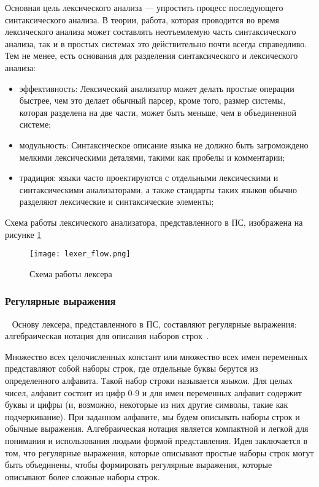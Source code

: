 Основная цель лексического анализа --- упростить процесс последующего синтаксического анализа. В теории, работа, которая проводится во время лексического анализа может
составлять неотъемлемую часть синтаксического анализа, так и в простых системах это действительно почти всегда справедливо. Тем не менее, есть основания для разделения синтаксического и лексического анализа:
\begin{itemize}
\item
  эффективность: Лексический анализатор может делать простые операции быстрее, чем это делает обычный парсер, кроме того, размер системы, которая разделена на две части, может
  быть меньше, чем в объединенной системе;
\item
  модульность: Синтаксическое описание языка не должно быть загромождено мелкими лексическими деталями, такими как пробелы и комментарии;
\item
  традиция: языки часто проектируются с отдельными лексическими и синтаксическими анализаторами, а также стандарты таких языков обычно разделяют лексические и синтаксические элементы;
\end{itemize}
Схема работы лексического анализатора, представленного в ПС, изображена на рисунке \ref{fig:arch_and_mod::lexer_flow}

\begin{figure}[!htb]
  \centering
  \texttt{[image: lexer\_flow.png]}
  \caption{ Схема работы лексера }
  \label{fig:arch_and_mod::lexer_flow}
  \clearpage
\end{figure}



\subsubsection{Регулярные выражения}~
\label{sec:arch_and_mod:regex}
Основу лексера, представленного в ПС, составляют регулярные выражения: алгебраическая нотация для описания наборов строк~\cite{regular_expressions_tutorial}.

Множество всех целочисленных констант или множество всех имен переменных представляют собой наборы строк, где отдельные буквы берутся из определенного алфавита. Такой набор
строки называется \textit{языком}. Для целых чисел, алфавит состоит из цифр 0-9 и для имен переменных алфавит содержит буквы и цифры (и, возможно, некоторые из них
другие символы, такие как подчеркивание). При заданном алфавите, мы будем описывать наборы строк и обычные выражения. Алгебраическая нотация является компактной и легкой для понимания и использования людьми формой представления. Идея заключается в том, что регулярные выражения, которые описывают простые наборы строк могут быть объединены, чтобы формировать регулярные выражения, которые описывают более сложные наборы строк.


